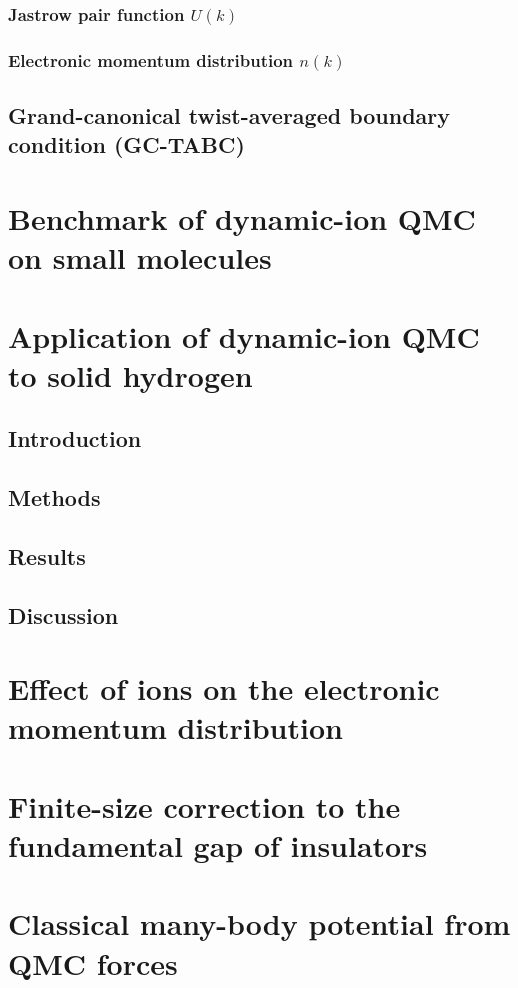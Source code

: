 \documentclass[draftthesis,fullpage]{uiucthesis}
\begin{document}
\subsection{Jastrow pair function $U(k)$}
\subsection{Electronic momentum distribution $n(k)$}
\section{Grand-canonical twist-averaged boundary condition (GC-TABC)}

\chapter{Benchmark of dynamic-ion QMC on small molecules}



\chapter{Application of dynamic-ion QMC to solid hydrogen}
\section{Introduction}
\section{Methods}
\section{Results}
\section{Discussion}

\chapter{Effect of ions on the electronic momentum distribution}



\chapter{Finite-size correction to the fundamental gap of insulators}


\chapter{Classical many-body potential from QMC forces}
\end{document}
